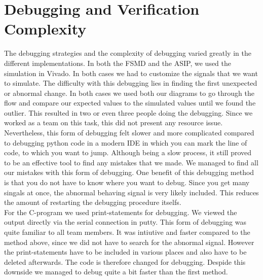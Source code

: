 \documentclass[conference]{IEEEtran}
\begin{document}
\section{Debugging and Verification Complexity}\label{sec:debugging}
The debugging strategies and the complexity of debugging varied greatly in the different implementations. In both the FSMD and the ASIP, we used the simulation in Vivado. In both cases we had to customize the signals that we want to simulate. The difficulty with this debugging lies in finding the first unexpected or abnormal change. In both cases we used both our diagrams to go through the flow and compare our expected values to the simulated values until we found the outlier. This resulted in two or even three people doing the debugging. Since we worked as a team on this task, this did not present any resource issue. Nevertheless, this form of debugging felt slower and more complicated compared to debugging python code in a modern IDE in which you can mark the line of code, to which you want to jump. Although being a slow process, it still proved to be an effective tool to find any mistakes that we made. We managed to find all our mistakes with this form of debugging. One benefit of this debugging method is that you do not have to know where you want to debug. Since you get many singals at once, the abnormal behaving signal is very likely included. This reduces the amount of restarting the debugging procedure itselfs. \\
For the C-program we used print-statements for debugging. We viewed the output directly via the serial connection in putty. This form of debugging was quite familiar to all team members. It was intiutive and faster compared to the method above, since we did not have to search for the abnormal signal. However the print-statements have to be included in various places and also have to be deleted afterwards. The code is therefore changed for debugging. Despide this downside we managed to debug quite a bit faster than the first method. \\
\end{document}
